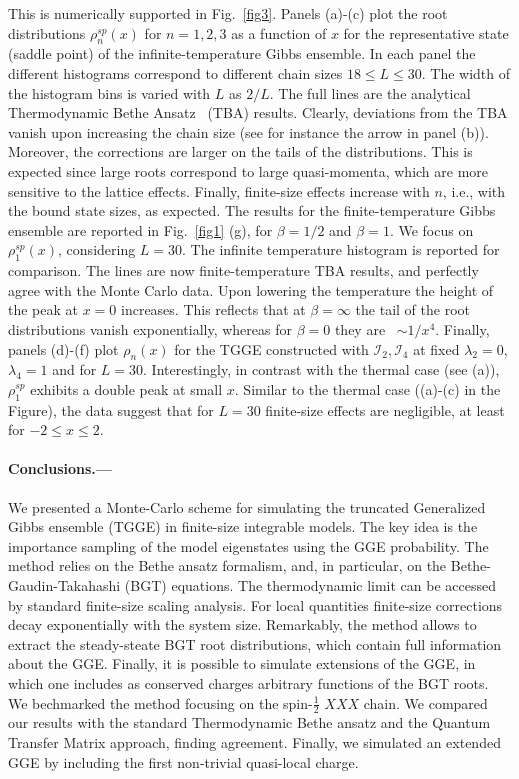 \documentclass[twocolumn,superscriptaddress,prb,10pt]{revtex4-1}
\begin{document}
This is numerically supported in Fig.~\ref{fig3}. Panels (a)-(c) plot the  
root distributions $\rho^{sp}_n(x)$ for $n=1,2,3$ as a function of $x$ for the representative 
state (saddle point) of the infinite-temperature Gibbs ensemble. In each panel 
the different histograms correspond to different chain sizes $18\le L\le 30$.
The width of the histogram bins is 
varied with $L$ as $2/L$. The full lines are the analytical   
Thermodynamic Bethe Ansatz~\cite{taka-book} (TBA) results. Clearly, deviations from 
the TBA vanish upon increasing the chain size (see for instance the arrow in panel (b)). 
Moreover, the corrections are larger on the tails of the distributions. This is expected 
since large roots correspond to large quasi-momenta, which are more sensitive to the 
lattice effects. Finally, finite-size effects increase with $n$, i.e., with the bound 
state sizes, as expected. The results for the finite-temperature Gibbs ensemble 
are reported in Fig.~\ref{fig1} (g), for $\beta=1/2$ and $\beta=1$. We focus on 
$\rho^{sp}_1(x)$, considering $L=30$. The 
infinite temperature histogram is reported for comparison. The lines are now 
finite-temperature TBA results, and perfectly agree with the Monte Carlo data. 
Upon lowering the temperature the height of the peak at $x=0$ increases. This reflects 
that at $\beta=\infty$ the tail of the root distributions vanish exponentially, whereas 
for $\beta=0$ they are~\cite{taka-book} $\sim 1/x^4$. 
Finally, panels (d)-(f) plot $\rho_n(x)$ for the TGGE constructed with ${\mathcal I}_2,
{\mathcal I}_4$ at fixed  $\lambda_2=0$, $\lambda_4=1$ and for $L=30$. Interestingly, 
in contrast with the thermal case (see (a)), $\rho^{sp}_1$ exhibits a double peak 
at small $x$. Similar to the thermal case ((a)-(c) in 
the Figure), the data suggest that for $L=30$ finite-size effects are negligible, 
at least for $-2\le x\le 2$. 


\paragraph*{Conclusions.---}

We presented a Monte-Carlo scheme for simulating the truncated Generalized 
Gibbs ensemble (TGGE) in finite-size integrable models. The key idea is the importance 
sampling of the model eigenstates using the GGE probability. The method relies 
on the Bethe ansatz formalism, and, in particular, on the Bethe-Gaudin-Takahashi (BGT) 
equations. The thermodynamic limit can be accessed by standard finite-size scaling analysis. 
For local quantities finite-size corrections decay exponentially 
with the system size. 
Remarkably, the method allows to extract the steady-steate BGT root 
distributions, which contain full information about the GGE. Finally, it 
is possible to simulate extensions of 
the GGE, in which one includes as conserved charges arbitrary functions 
of the BGT roots. We bechmarked the method focusing on the spin-$\frac{1}{2}$ $XXX$ chain. 
We compared our results with the standard  
Thermodynamic Bethe ansatz and the Quantum Transfer Matrix approach, finding  
agreement. Finally, we simulated an extended GGE by including the first non-trivial 
quasi-local charge. 
\end{document}
